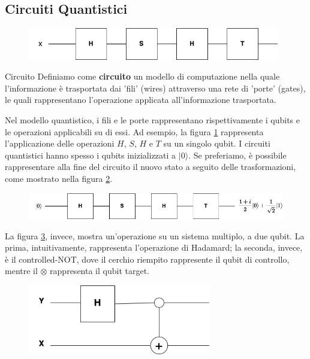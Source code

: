 \subsection{Circuiti Quantistici}
\begin{figure}[h]
    \centering
    \includegraphics[width = 11cm]{./Images/circ2.png}
    \caption{}
    \label{fig1}
\end{figure}
\begin{definition}{Circuito}{}
    Definiamo come \textbf{circuito} un modello di computazione nella quale l'informazione
    è trasportata dai 'fili' (wires) attraverso una rete di 'porte' (gates), le quali rappresentano
    l'operazione applicata all'informazione trasportata.
\end{definition}
Nel modello quantistico, i fili e le porte rappresentano rispettivamente i qubits e le operazioni applicabili su di essi.
Ad esempio, la figura \ref{fig1} rappresenta l'applicazione delle operazioni $H$, $S$, $H$ e $T$ su un
singolo qubit. I circuiti quantistici hanno spesso i qubits inizializzati a $|0\rangle$. Se preferiamo,
è possibile rappresentare alla fine del circuito il nuovo stato a seguito delle trasformazioni, come mostrato
nella figura \ref{fig2}.

\begin{figure}[h]
    \centering
    \includegraphics[width = 12cm]{./Images/circ3.png}
    \caption{}
    \label{fig2}
\end{figure}

La figura \ref{fig4}, invece, mostra un'operazione su un sistema multiplo, a due qubit. La prima,
intuitivamente, rappresenta l'operazione di Hadamard; la seconda, invece, è il controlled-NOT, dove il cerchio
riempito rappresente il qubit di controllo, mentre il $\otimes$ rappresenta il qubit target.

\begin{figure}[h]
    \centering
    \includegraphics[width = 8cm]{./Images/circ42.png}
    \caption{}
    \label{fig4}
\end{figure}

